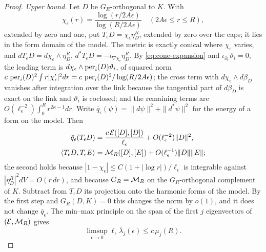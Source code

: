 \begin{proof}
\emph{Upper bound.} Let $D$ be $G_R$-orthogonal to $K$. With
\[
 \chi_\epsilon(r)=\frac{\log(r/2A\epsilon)}{\log(R/2A\epsilon)}
 \quad(2A\epsilon\le r\le R),
\]
extended by zero and one, put $T_\epsilon D=\chi_\epsilon\eta^R_D$,
extended by zero over the caps; it lies in the form domain of the model.
The metric is exactly conical where $\chi_\epsilon$ varies, and
$dT_\epsilon D=d\chi_\epsilon\wedge\eta^R_D$,
$d^*T_\epsilon D=-\iota_{\nabla\chi_\epsilon}\eta^R_D$. By
\eqref{eq:cone-expansion} and $\iota_{\partial_r}\vartheta_i=0$, the
leading term is $d\chi_\epsilon\wedge \operatorname{per}_i(D)\vartheta_i$, of squared norm
$c\,\operatorname{per}_i(D)^2\int r|\chi_\epsilon'|^2dr=c\,\operatorname{per}_i(D)^2/\log(R/2A\epsilon)$;
the cross term with $d\chi_\epsilon\wedge d\beta_D$ vanishes after
integration over the link because the tangential part of $d\beta_D$ is
exact on the link and $\vartheta_i$ is coclosed; and the remaining terms
are $O(\ell_\epsilon^{-2})\int_0^Rr^{2\kappa-1}dr$. Write $\bar q_\epsilon(\psi)=\|d\psi\|^2+\|d^*\psi\|^2$ for the energy
of a form on the model. Then
\begin{equation}\label{eq:trial}
\begin{split}
 \bar q_\epsilon(T_\epsilon D)&=\frac{c\,\mathcal E([D],[D])}{\ell_\epsilon}
 +O(\ell_\epsilon^{-2})\|D\|^2,\\
 \langle T_\epsilon D,T_\epsilon E\rangle&=\mathcal M_R([D],[E])
 +O(\ell_\epsilon^{-1})\|D\|\|E\| ;
\end{split}
\end{equation}
the second holds because $|1-\chi_\epsilon|\le C(1+|\log r|)/\ell_\epsilon$
is integrable against $|\eta^R_D|^2dV=O(r\,dr)$, and
because $G_R=\mathcal M_R$ on the $G_R$-orthogonal complement of $K$. Subtract
from $T_\epsilon D$ its projection onto the harmonic forms of the model.
By the first step and $G_R(D,K)=0$ this changes the norm by $o(1)$, and
it does not change $\bar q_\epsilon$. The min--max principle on the span
of the first $j$ eigenvectors of $(\mathcal E,\mathcal M_R)$ gives
\[
 \limsup_{\epsilon\to0}\ell_\epsilon\bar\lambda_j(\epsilon)\le c\,\mu_j(R).
\]


\end{proof}
